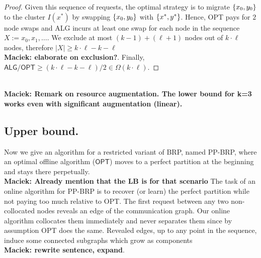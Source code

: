 \documentclass[manuscript,screen=true, review, anonymous]{acmart}
\newcommand{\OPT}{\textsf{OPT}\xspace}
\newcommand{\ALG}{\textsf{ALG}\xspace}
\newcommand{\OBRP}{BRP}
\newcommand{\PPOBRP}{PP-BRP}
\DeclarePairedDelimiter\set{\{}{\}}
\newcommand\maciek[1]{\color{brown}\textbf{\\ Maciek: #1}\color{black}}
\begin{document}
\begin{proof}
	Given this sequence of requests,
	the optimal strategy is to migrate $\set{x_0,y_0}$ to the cluster $I(x^*)$ by
	swapping $\set{x_0,y_0}$ with $\set{x^*,y^*}$.
	Hence,
	OPT pays for $2$ node swaps and
	\ALG{} incurs at least one swap for each node in the sequence $X := x_0, x_1,\dots$.
	We exclude at most $(k-1) + ( \ell+1)$ nodes out of $k \cdot \ell$ nodes,
  therefore $|X| \geq k \cdot \ell - k - \ell$ \maciek{elaborate on exclusion?}.
  Finally, $\ALG/\OPT \geq (k \cdot \ell - k - \ell) / 2\in \Omega(k\cdot\ell)$.
\end{proof}

\maciek{Remark on resource augmentation. The lower bound for k=3 works even with significant augmentation (linear).}

\subsection{Upper bound.}
Now we give an algorithm for a restricted variant of  \OBRP{}, named \PPOBRP{},
where an optimal offline algorithm ($\OPT$) moves to a perfect partition
at the beginning and stays there perpetually.
\maciek{Already mention that the LB is for that scenario}
The task of an online algorithm for \PPOBRP{} is to recover (or learn) the perfect partition while not paying too much relative to \OPT.
%
The first request between any two non-collocated nodes reveals an edge of the communication graph.
Our online algorithm collocates them immediately and never separates them since by assumption \OPT does the same.
Revealed edges, up to any point in the sequence,
induce some connected subgraphs which grow as components \maciek{rewrite sentence, expand}.
\end{document}
